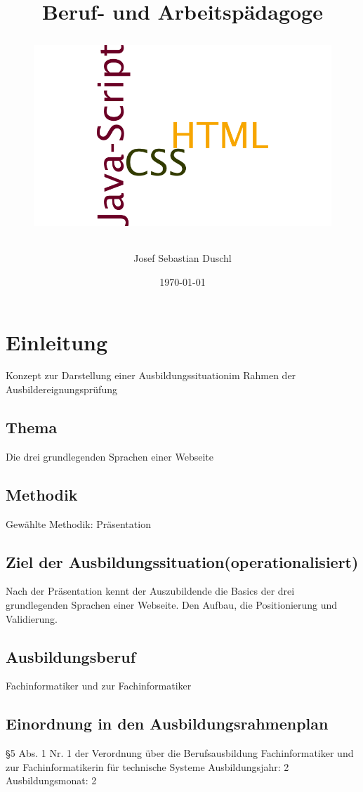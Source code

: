 \documentclass[a4paper, 12pt]{article}
\title{
	Beruf- und Arbeitspädagoge\\
	 \thema
	\newline
	\begin{figure}[h!]
		\vspace{15mm}
	\includegraphics[scale=0.2, width=\linewidth]{../pics/htmlCssJsWordwordle.png}
\end{figure}
	\vfill
}
\author{
	Josef Sebastian Duschl
}
\date{\today}
\newcommand{\thema}{Die drei grundlegenden Sprachen einer Webseite}
\begin{document}


    \maketitle
    \newpage

    \tableofcontents %
    \newpage

	\section{Einleitung}
	Konzept zur Darstellung einer Ausbildungssituationim Rahmen der Ausbildereignungsprüfung
	\subsection{Thema}
	\thema

    \subsection{Methodik}
        Gewählte Methodik: Präsentation
     
    \subsection{Ziel der Ausbildungssituation(operationalisiert)}     
        Nach der Präsentation kennt der Auszubildende die Basics der drei grundlegenden Sprachen einer Webseite. Den Aufbau, die Positionierung und Validierung.
        
    \subsection{Ausbildungsberuf}
    Fachinformatiker und zur Fachinformatiker
    
    \subsection{Einordnung in den Ausbildungsrahmenplan}
    §5 Abs. 1 Nr. 1 der Verordnung über die Berufsausbildung  Fachinformatiker und zur Fachinformatikerin für technische Systeme
    \newline
    Ausbildungsjahr: 2\\
    Ausbildungsmonat: 2\\
   
\end{document}

